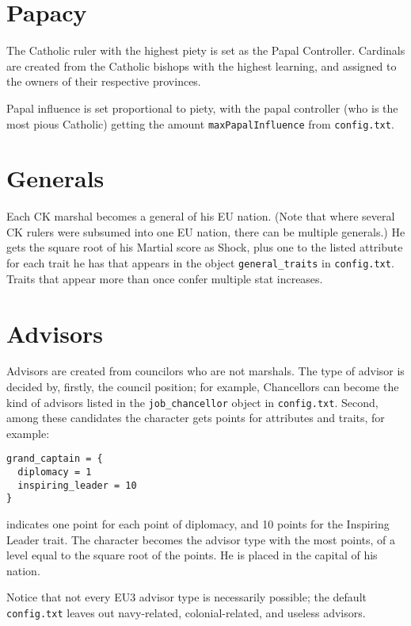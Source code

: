 \documentclass[12pt,ebook,oneside]{book}
\begin{document}
\section{Papacy}

The Catholic ruler with the highest piety is set as the Papal
Controller. Cardinals are created from the Catholic bishops with the
highest learning, and assigned to the owners of their respective
provinces. 

Papal influence is set proportional to piety, with the papal
controller (who is the most pious Catholic) getting the amount
\verb|maxPapalInfluence| from \verb|config.txt|. 

\section{Generals}

Each CK marshal becomes a general of his EU nation. (Note that where
several CK rulers were subsumed into one EU nation, there can be
multiple generals.) He gets the
square root of his Martial score as Shock, plus one to the listed
attribute for each trait he has that appears in the object
\verb|general_traits| in \verb|config.txt|. Traits that appear more
than once confer multiple stat increases. 

\section{Advisors}

Advisors are created from councilors who are not marshals. The type of
advisor is decided by, firstly, the council position; for example,
Chancellors can become the kind of advisors listed in the
\verb|job_chancellor| object in \verb|config.txt|. Second, among these
candidates the character gets points for attributes and traits, for
example:
\begin{verbatim}
grand_captain = {
  diplomacy = 1
  inspiring_leader = 10
} 
\end{verbatim}
indicates one point for each point of diplomacy, and 10 points for the
Inspiring Leader trait. The character becomes the advisor type with
the most points, of a level equal to the square root of the points. 
He is placed in the capital of his nation. 

Notice that not every EU3 advisor type is necessarily possible; the
default \verb|config.txt| leaves out navy-related, colonial-related,
and useless advisors. 
\end{document}

